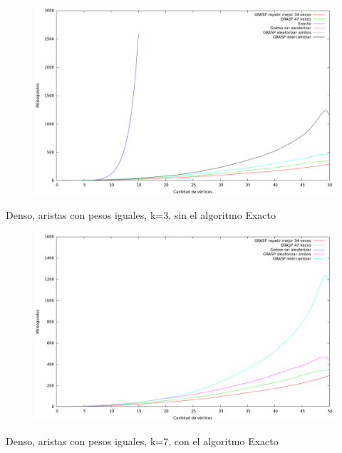 \begin{figure}[H]
  \begin{center}
    \includegraphics[scale=0.35]{imagenes/ej6-denso-pesos-iguales-k3-tiempo-exacto.png}
  \end{center}
\end{figure}

Denso, aristas con pesos iguales, k=3, sin el algoritmo Exacto

\begin{figure}[H]
  \begin{center}
    \includegraphics[scale=0.35]{imagenes/ej6-denso-pesos-iguales-k3-tiempo.png}
  \end{center}
\end{figure}

Denso, aristas con pesos iguales, k=7, con el algoritmo Exacto

